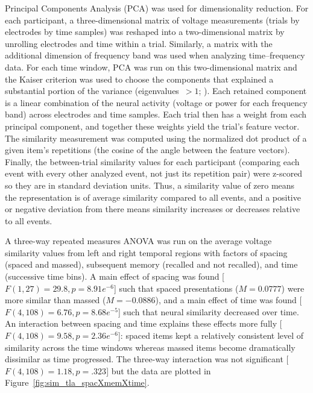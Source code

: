 
Principal Components Analysis (PCA) was used for dimensionality reduction.  For each participant, a three-dimensional matrix of voltage measurements (trials by electrodes by time samples) was reshaped into a two-dimensional matrix by unrolling electrodes and time within a trial.  Similarly, a matrix with the additional dimension of frequency band was used when analyzing time--frequency data.  For each time window, PCA was run on this two-dimensional matrix and the Kaiser criterion was used to choose the components that explained a substantial portion of the variance (eigenvalues~$>1$; ).
Each retained component is a linear combination of the neural activity (voltage or power for each frequency band) across electrodes and time samples.  Each trial then has a weight from each principal component, and together these weights yield the trial's feature vector.  The similarity measurement was computed using the normalized dot product of a given item's repetitions (the cosine of the angle between the feature vectors).  Finally, the between-trial similarity values for each participant (comparing each event with every other analyzed event, not just its repetition pair) were z-scored so they are in standard deviation units.  Thus, a similarity value of zero means the representation is of average similarity compared to all events, and a positive or negative deviation from there means similarity increases or decreases relative to all events.




A three-way repeated measures ANOVA was run on the average voltage similarity values from left and right temporal regions with factors of spacing (spaced and massed), subsequent memory (recalled and not recalled), and time (successive time bins).  A main effect of spacing was found [$F(1,27)=29.8, p=8.91e^{-6}$] such that spaced presentations ($M=0.0777$) were more similar than massed ($M=-0.0886$), and a main effect of time was found [$F(4,108)=6.76, p=8. 68e^{-5}$] such that neural similarity decreased over time.
An interaction between spacing and time explains these effects more fully [$F(4,108)=9.58, p=2.36e^{-6}$]: spaced items kept a relatively consistent level of similarity across the time windows whereas massed items become dramatically dissimilar as time progressed.  The three-way interaction was not significant [$F(4,108)=1.18, p=.323$] but the data are plotted in Figure~\ref{fig:sim_tla_spacXmemXtime}.


